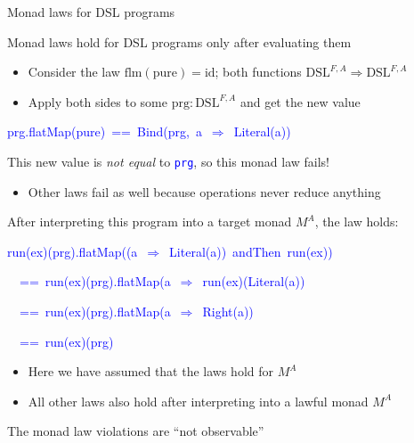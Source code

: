 \documentclass[english,,russian]{beamer}
\newenvironment{lyxcode}
  {\par\begin{list}{}{
    \setlength{\rightmargin}{\leftmargin}
    \setlength{\listparindent}{0pt}%
    \raggedright
    \setlength{\itemsep}{0pt}
    \setlength{\parsep}{0pt}
    \normalfont\ttfamily}%
   \def\{{\char`\{}
   \def\}{\char`\}}
   \def\textasciitilde{\char`\~}
   \item[]}
  {\end{list}}
\begin{document}
\begin{frame}{Monad laws for DSL programs}

Monad laws hold for DSL programs only after evaluating them
\begin{itemize}
\item Consider the law $\text{flm}\left(\text{pure}\right)=\text{id}$;
both functions $\text{DSL}^{F,A}\Rightarrow\text{DSL}^{F,A}$
\item Apply both sides to some $\text{prg}:\text{DSL}^{F,A}$ and get the
new value
\end{itemize}
\begin{lyxcode}
\textcolor{blue}{\footnotesize{}prg.flatMap(pure)~==~Bind(prg,~a~$\Rightarrow$~Literal(a))}{\footnotesize\par}
\end{lyxcode}
\begin{itemize}
\item This new value is \emph{not equal} to \texttt{\textcolor{blue}{\footnotesize{}prg}},
so this monad law fails!
\begin{itemize}
\item Other laws fail as well because operations never reduce anything
\end{itemize}
\item After interpreting this program into a target monad $M^{A}$, the
law holds:
\begin{lyxcode}
\textcolor{blue}{\footnotesize{}run(ex)(prg).flatMap((a~$\Rightarrow$~Literal(a))~andThen~run(ex))~}{\footnotesize\par}

\textcolor{blue}{\footnotesize{}~~==~run(ex)(prg).flatMap(a~$\Rightarrow$~run(ex)(Literal(a))~}{\footnotesize\par}

\textcolor{blue}{\footnotesize{}~~==~run(ex)(prg).flatMap(a~$\Rightarrow$~Right(a))}{\footnotesize\par}

\textcolor{blue}{\footnotesize{}~~==~run(ex)(prg)}{\footnotesize\par}
\end{lyxcode}
\begin{itemize}
\item Here we have assumed that the laws hold for $M^{A}$
\item All other laws also hold after interpreting into a lawful monad $M^{A}$
\end{itemize}
\end{itemize}
The monad law violations are ``not observable''
\end{frame}
\end{document}
